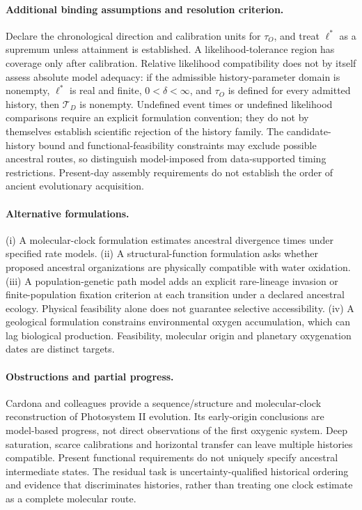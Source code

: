 \documentclass[11pt]{article}
\begin{document}
\paragraph{Additional binding assumptions and resolution criterion.} Declare the chronological direction and calibration units for $\tau_O$, and treat $\ell^*$ as a supremum unless attainment is established. A likelihood-tolerance region has coverage only after calibration. Relative likelihood compatibility does not by itself assess absolute model adequacy: if the admissible history-parameter domain is nonempty, $\ell^*$ is real and finite, $0<\delta<\infty$, and $\tau_O$ is defined for every admitted history, then $\mathcal T_D$ is nonempty. Undefined event times or undefined likelihood comparisons require an explicit formulation convention; they do not by themselves establish scientific rejection of the history family. The candidate-history bound and functional-feasibility constraints may exclude possible ancestral routes, so distinguish model-imposed from data-supported timing restrictions. Present-day assembly requirements do not establish the order of ancient evolutionary acquisition.

\paragraph{Alternative formulations.} (i) A molecular-clock formulation estimates ancestral divergence times under specified rate models. (ii) A structural-function formulation asks whether proposed ancestral organizations are physically compatible with water oxidation. (iii) A population-genetic path model adds an explicit rare-lineage invasion or finite-population fixation criterion at each transition under a declared ancestral ecology. Physical feasibility alone does not guarantee selective accessibility. (iv) A geological formulation constrains environmental oxygen accumulation, which can lag biological production. Feasibility, molecular origin and planetary oxygenation dates are distinct targets.

\paragraph{Obstructions and partial progress.} Cardona and colleagues provide a sequence/structure and molecular-clock reconstruction of Photosystem II evolution. Its early-origin conclusions are model-based progress, not direct observations of the first oxygenic system. Deep saturation, scarce calibrations and horizontal transfer can leave multiple histories compatible. Present functional requirements do not uniquely specify ancestral intermediate states. The residual task is uncertainty-qualified historical ordering and evidence that discriminates histories, rather than treating one clock estimate as a complete molecular route.
\end{document}
